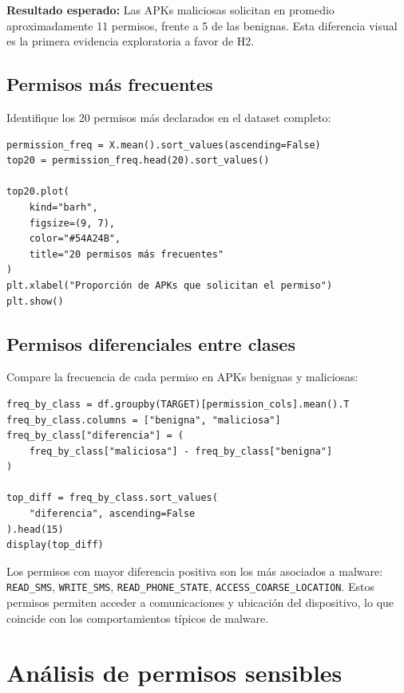 \documentclass[
  coursetitle={Cómputo Nube y Tecnologías Emergentes},
  coursehours={96},
  coursedate={Verano 2026},
  doctype={Tutorial},
  otherlangs={english,french},
  authorname={Lázaro},
  authorsurname={Bustio-Martínez},
  authortitle={PhD},
  role={Profesor Investigador},
  email={lbustio@inaoe.mx},
  phone={5559504000},
  ext={7459},
  institution={Instituto Nacional de Astrofísica, Óptica y Electrónica (INAOE)},
  department={Maestría en Ciencias en Tecnologías de Seguridad},
  address={Luis Enrique Erro 1, Sta. Ma. Tonantzintla, San Andrés Cholula, CP 72840, Puebla, México},
  margin={0.5in}
]{../../lbustio_lecture_notes}
\begin{document}
\textbf{Resultado esperado:} Las APKs maliciosas solicitan en promedio aproximadamente 11 permisos, frente a 5 de las benignas. Esta diferencia visual es la primera evidencia exploratoria a favor de H2.

\subsection{Permisos más frecuentes}

Identifique los 20 permisos más declarados en el dataset completo:

\begin{lstlisting}
permission_freq = X.mean().sort_values(ascending=False)
top20 = permission_freq.head(20).sort_values()

top20.plot(
    kind="barh",
    figsize=(9, 7),
    color="#54A24B",
    title="20 permisos más frecuentes"
)
plt.xlabel("Proporción de APKs que solicitan el permiso")
plt.show()
\end{lstlisting}

\subsection{Permisos diferenciales entre clases}

Compare la frecuencia de cada permiso en APKs benignas y maliciosas:

\begin{lstlisting}
freq_by_class = df.groupby(TARGET)[permission_cols].mean().T
freq_by_class.columns = ["benigna", "maliciosa"]
freq_by_class["diferencia"] = (
    freq_by_class["maliciosa"] - freq_by_class["benigna"]
)

top_diff = freq_by_class.sort_values(
    "diferencia", ascending=False
).head(15)
display(top_diff)
\end{lstlisting}

\begin{tcolorbox}[title=Interpretación]
Los permisos con mayor diferencia positiva son los más asociados a malware: \texttt{READ\_SMS}, \texttt{WRITE\_SMS}, \texttt{READ\_PHONE\_STATE}, \texttt{ACCESS\_COARSE\_LOCATION}. Estos permisos permiten acceder a comunicaciones y ubicación del dispositivo, lo que coincide con los comportamientos típicos de malware.
\end{tcolorbox}

\section{Análisis de permisos sensibles}
\end{document}
